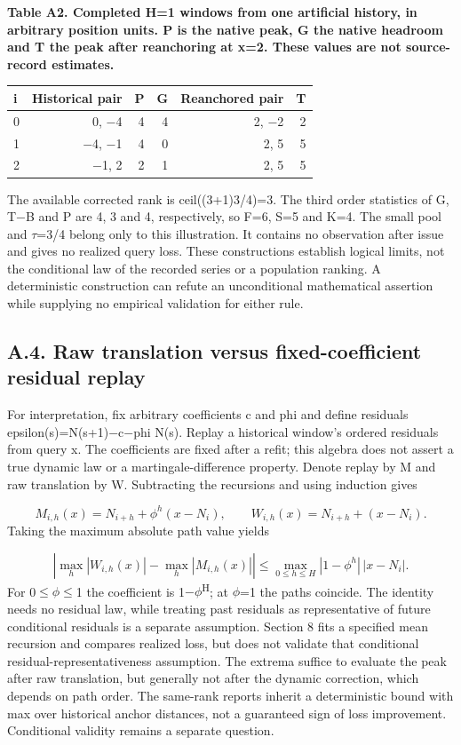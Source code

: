 \documentclass[10pt,a4paper]{article}
\begin{document}
\begin{center}
\begin{minipage}{\linewidth}
\small\textbf{Table A2. Completed H=1 windows from one artificial history, in arbitrary position units. P is the native peak, G the native headroom and T the peak after reanchoring at x=2. These values are not source-record estimates.}\par\medskip
\centering\fontsize{8}{10}\selectfont
\begin{tabular}{lrrrrr}
\toprule
i & Historical pair & P & G & Reanchored pair & T \\
\midrule
0 & 0, \(-\)4 & 4 & 4 & 2, \(-\)2 & 2 \\
1 & \(-\)4, \(-\)1 & 4 & 0 & 2, 5 & 5 \\
2 & \(-\)1, 2 & 2 & 1 & 2, 5 & 5 \\
\bottomrule
\end{tabular}
\end{minipage}
\end{center}
The available corrected rank is ceil((3+1)3/4)=3. The third order statistics of G, T\(-\)B and P are 4, 3 and 4, respectively, so F=6, S=5 and K=4. The small pool and \(\tau\)=3/4 belong only to this illustration. It contains no observation after issue and gives no realized query loss. These constructions establish logical limits, not the conditional law of the recorded series or a population ranking. A deterministic construction can refute an unconditional mathematical assertion while supplying no empirical validation for either rule.

\subsection*{A.4. Raw translation versus fixed-coefficient residual replay}
For interpretation, fix arbitrary coefficients c and phi and define residuals epsilon(s)=N(s+1)\(-\)c\(-\)phi N(s). Replay a historical window's ordered residuals from query x. The coefficients are fixed after a refit; this algebra does not assert a true dynamic law or a martingale-difference property. Denote replay by M and raw translation by W. Subtracting the recursions and using induction gives

\[
M_{i,h}(x)=N_{i+h}+\phi^h(x-N_i),\qquad W_{i,h}(x)=N_{i+h}+(x-N_i).
\]
Taking the maximum absolute path value yields

\[
\left|\max_h|W_{i,h}(x)|-\max_h|M_{i,h}(x)|\right|\le\max_{0\le h\le H}|1-\phi^h|\,|x-N_i|.
\]
For 0\(\le\)\(\phi\)\(\le\)1 the coefficient is 1\(-\)\(\phi\)\textsuperscript{H}; at \(\phi\)=1 the paths coincide. The identity needs no residual law, while treating past residuals as representative of future conditional residuals is a separate assumption. Section 8 fits a specified mean recursion and compares realized loss, but does not validate that conditional residual-representativeness assumption. The extrema suffice to evaluate the peak after raw translation, but generally not after the dynamic correction, which depends on path order. The same-rank reports inherit a deterministic bound with max over historical anchor distances, not a guaranteed sign of loss improvement. Conditional validity remains a separate question.
\end{document}
